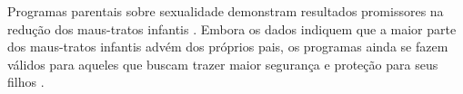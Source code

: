 






Programas parentais sobre sexualidade demonstram resultados promissores na redução dos maus-tratos infantis \cite{silverman2008evidence}. Embora os dados indiquem que a maior parte dos maus-tratos infantis advém dos próprios pais, os programas ainda se fazem válidos para aqueles que buscam trazer maior segurança e proteção para seus filhos \cite{pelisoli2010prevenccao}.


  



